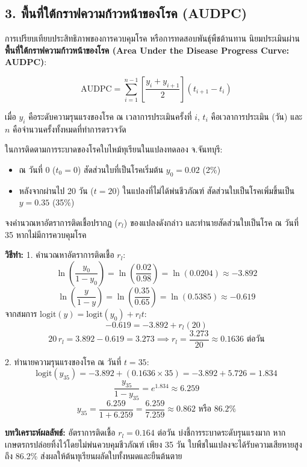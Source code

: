 \subsection{3. พื้นที่ใต้กราฟความก้าวหน้าของโรค (AUDPC)}
การเปรียบเทียบประสิทธิภาพของการควบคุมโรค หรือการทดสอบพันธุ์พืชต้านทาน นิยมประเมินผ่าน \textbf{พื้นที่ใต้กราฟความก้าวหน้าของโรค (Area Under the Disease Progress Curve: AUDPC)}:

\begin{equation}
\text{AUDPC} = \sum_{i=1}^{n-1} \left[ \frac{y_i + y_{i+1}}{2} \right] (t_{i+1} - t_i)
\end{equation}

เมื่อ $y_i$ คือระดับความรุนแรงของโรค ณ เวลาการประเมินครั้งที่ $i$, $t_i$ คือเวลาการประเมิน (วัน) และ $n$ คือจำนวนครั้งทั้งหมดที่ทำการตรวจวัด

\begin{worked}
ในการติดตามการระบาดของโรคใบไหม้ทุเรียนในแปลงทดลอง จ.จันทบุรี:
\begin{itemize}
    \item ณ วันที่ 0 ($t_0 = 0$) สัดส่วนใบที่เป็นโรคเริ่มต้น $y_0 = 0.02$ (2\%)
    \item หลังจากผ่านไป 20 วัน ($t = 20$) ในแปลงที่ไม่ได้พ่นชีวภัณฑ์ สัดส่วนใบเป็นโรคเพิ่มขึ้นเป็น $y = 0.35$ (35\%)
\end{itemize}
จงคำนวณหาอัตราการติดเชื้อปรากฏ ($r_l$) ของแปลงดังกล่าว และทำนายสัดส่วนใบเป็นโรค ณ วันที่ 35 หากไม่มีการควบคุมโรค

\textbf{วิธีทำ:}
1. คำนวณหาอัตราการติดเชื้อ $r_l$:
$$\ln\left(\frac{y_0}{1 - y_0}\right) = \ln\left(\frac{0.02}{0.98}\right) = \ln(0.0204) \approx -3.892$$
$$\ln\left(\frac{y}{1 - y}\right) = \ln\left(\frac{0.35}{0.65}\right) = \ln(0.5385) \approx -0.619$$
จากสมการ $\text{logit}(y) = \text{logit}(y_0) + r_l t$:
$$-0.619 = -3.892 + r_l (20)$$
$$20 \, r_l = 3.892 - 0.619 = 3.273 \implies r_l = \frac{3.273}{20} \approx 0.1636 \text{ ต่อวัน}$$

2. ทำนายความรุนแรงของโรค ณ วันที่ $t = 35$:
$$\text{logit}(y_{35}) = -3.892 + (0.1636 \times 35) = -3.892 + 5.726 = 1.834$$
$$\frac{y_{35}}{1 - y_{35}} = e^{1.834} \approx 6.259$$
$$y_{35} = \frac{6.259}{1 + 6.259} = \frac{6.259}{7.259} \approx 0.862 \text{ หรือ } 86.2\%$$

\textbf{บทวิเคราะห์ผลลัพธ์:} อัตราการติดเชื้อ $r_l = 0.164$ ต่อวัน บ่งชี้การระบาดระดับรุนแรงมาก หากเกษตรกรปล่อยทิ้งไว้โดยไม่พ่นควบคุมชีวภัณฑ์ เพียง 35 วัน ใบพืชในแปลงจะได้รับความเสียหายสูงถึง 86.2\% ส่งผลให้ต้นทุเรียนผลัดใบทั้งหมดและยืนต้นตาย
\end{worked}

